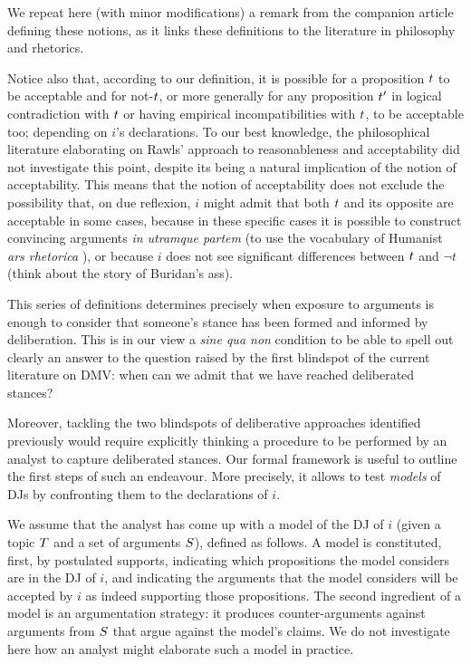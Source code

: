 \documentclass[version=3.21, pagesize, twoside=off, bibliography=totoc, DIV=calc, fontsize=12pt, a4paper, french, english]{scrartcl}
\begin{document}
We repeat here (with minor modifications) a remark from the companion article defining these notions, as it links these definitions to the literature in philosophy and rhetorics.
\begin{remark}
Notice also that, according to our definition, it is possible for a proposition $t$ to be acceptable and for not-$t$, or more generally for any proposition $t'$ in logical contradiction with $t$ or having empirical incompatibilities with $t$, to be acceptable too; depending on $i$’s declarations.
To our best knowledge, the philosophical literature elaborating on Rawls' approach to reasonableness and acceptability did not investigate this point, despite its being a natural implication of the notion of acceptability. 
This means that the notion of acceptability does not exclude the possibility that, on due reflexion, $i$ might admit that both $t$ and its opposite are acceptable in some cases, because in these specific cases it is possible to construct convincing arguments \emph{in utramque partem} (to use the vocabulary of Humanist \emph{ars rhetorica} \citep{skinner_reason_1996}), or because $i$ does not see significant differences between $t$ and $¬t$ (think about the story of Buridan’s ass).
\end{remark}

This series of definitions determines precisely when exposure to arguments is enough to consider that someone’s stance has been formed and informed by deliberation. 
This is in our view a \emph{sine qua non} condition to be able to spell out clearly an answer to the question raised by the first blindspot of the current literature on DMV: when can we admit that we have reached deliberated stances?

Moreover, tackling the two blindspots of deliberative approaches identified previously would require explicitly thinking a procedure to be performed by an analyst to capture deliberated stances. Our formal framework is useful to outline the first steps of such an endeavour. More precisely, it allows to test \emph{models} of \acp{DJ} by confronting them to the declarations of $i$.

We assume that the analyst has come up with a model of the \ac{DJ} of $i$ (given a topic $T$ and a set of arguments $S$), defined as follows. A model is constituted, first, by postulated supports, indicating which propositions the model considers are in the \ac{DJ} of $i$, and indicating the arguments that the model considers will be accepted by $i$ as indeed supporting those propositions. The second ingredient of a model is an argumentation strategy: it produces counter-arguments against arguments from $S$ that argue against the model's claims. We do not investigate here how an analyst might elaborate such a model in practice.
\end{document}
